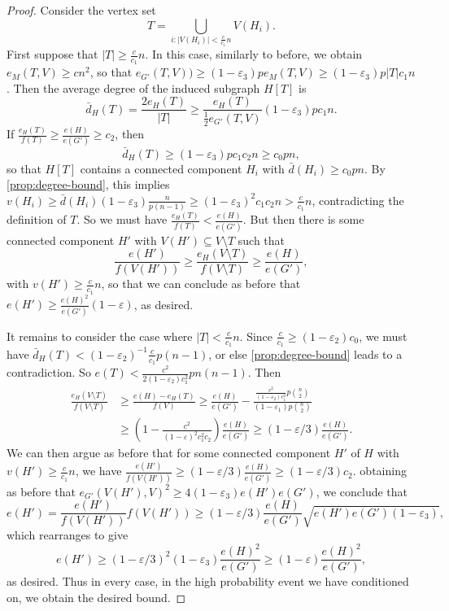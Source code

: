 \documentclass[12pt]{amsart}
\theoremstyle{definition}
\numberwithin{equation}{section}
\begin{document}
\begin{proof}
    Consider the vertex set
    \[
        T=\bigcup_{i:|V(H_i)|<\frac{c}{c_1}n}V(H_i).
    \]
    First suppose that $|T|\ge \frac{c}{c_1}n$. In this case, similarly to before, we obtain $e_M(T,V)\ge cn^2$, so that $e_{G'}(T,V))\ge (1-\varepsilon_3)pe_M(T,V)\ge (1-\varepsilon_3)p|T|c_1 n$. Then the average degree of the induced subgraph $H[T]$ is
    \[
        \bar d_{H}(T)=\frac{2e_{H}(T)}{|T|}\ge \frac{e_{H}(T)}{\frac{1}{2}e_{G'}(T,V)}(1-\varepsilon_3)pc_1 n.
    \]
    If $\frac{e_H(T)}{f(T)}\ge \frac{e(H)}{e(G')}\ge c_2$, then
    \[
        \bar d_{H}(T)\ge (1-\varepsilon_3)pc_1 c_2 n \ge c_0 pn,
    \]
    so that $H[T]$ contains a connected component $H_i$ with $\bar d(H_i)\ge c_0 pn$. By \cref{prop:degree-bound}, this implies $v(H_i)\ge \bar d(H_i)(1-\varepsilon_3)\frac{n}{p(n-1)}\ge (1-\varepsilon_3)^2 c_1 c_2 n>\frac{c}{c_1}n$,
    contradicting the definition of $T$. So we must have $\frac{e_H(T)}{f(T)}< \frac{e(H)}{e(G')}$. But then there is some connected component $H'$ with $V(H')\subseteq V\setminus T$ such that
    \[
        \frac{e(H')}{f(V(H'))} \ge \frac{e_{H}(V\setminus T)}{f(V\setminus T)} \ge \frac{e(H)}{e(G')},
    \]
    with $v(H')\ge \frac{c}{c_1}n$, so that we can conclude as before that $e(H')\ge \frac{e(H)^2}{e(G')}(1-\varepsilon)$, as desired.

    It remains to consider the case where $|T|<\frac{c}{c_1}n$. Since $\frac{c}{c_1}\ge (1-\varepsilon_2)c_0$, we must have $\bar d_{H}(T)<(1-\varepsilon_2)^{-1} \frac{c}{c_1}p(n-1)$, or else \cref{prop:degree-bound} leads to a contradiction. So $e(T)<\frac{c^2}{2(1-\varepsilon_2)c_1^2}pn(n-1)$. Then
    \begin{align*}
        \frac{e_{H}(V\setminus T)}{f(V\setminus T)}&\ge \frac{e(H)-e_{H}(T)}{f(V)}\ge \frac{e(H)}{e(G')}-\frac{\frac{c^2}{(1-\varepsilon_2)c_1^2}p\binom{n}{2}}{(1-\varepsilon_1)p\binom{n}{2}}\\
        &\ge \left(1-\frac{c^2}{(1-\varepsilon)^2c_1^2c_2}\right)\frac{e(H)}{e(G')} \ge (1-\varepsilon/3)\frac{e(H)}{e(G')}.
    \end{align*}
    We can then argue as before that for some connected component $H'$ of $H$ with $v(H')\ge \frac{c}{c_1}n$, we have $\frac{e(H')}{f(V(H'))}\ge (1-\varepsilon/3)\frac{e(H)}{e(G')}\ge (1-\varepsilon/3)c_2$. obtaining as before that $e_{G'}(V(H'),V)^2\ge 4(1-\varepsilon_3)e(H')e(G')$, we conclude that
    \[
        e(H')=\frac{e(H')}{f(V(H'))} f(V(H')) \ge(1-\varepsilon/3) \frac{e(H)}{e(G')}\sqrt{e(H')e(G')(1-\varepsilon_3)},
    \]
    which rearranges to give
    \[
        e(H')\ge (1-\varepsilon/3)^2(1-\varepsilon_3)\frac{e(H)^2}{e(G')}\ge (1-\varepsilon)\frac{e(H)^2}{e(G')},
    \]
    as desired. 
    Thus in every case, in the high probability event we have conditioned on, we obtain the desired bound.
\end{proof}
\end{document}
